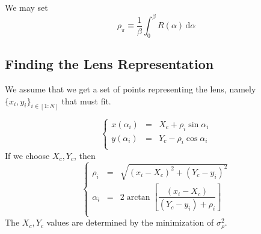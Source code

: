 \documentclass[aps,onecolumn]{revtex4}
\begin{document}
We may set 
\begin{equation}
	\rho_\pi \equiv \dfrac{1}{\beta}\int_0^\beta R(\alpha)\,\mathrm{d}\alpha
\end{equation}

\subsection{Finding the Lens Representation}
We assume that we get a set of points representing the lens, namely $\lbrace x_i,y_i \rbrace_{i\in[1:N]}$ that must
fit.

\begin{equation}
	\left\lbrace
		\begin{array}{rcl}
	x(\alpha_i) & = & X_c + \rho_i\sin\alpha_i\\
	y(\alpha_i) & = & Y_c - \rho_i\cos\alpha_i\\
		\end{array}
	\right.
\end{equation}
If we choose $X_c,Y_c$, then
\begin{equation}
	\left\lbrace
	\begin{array}{rcl}	
	\rho_i   &=&\sqrt{\left(x_i-X_c\right)^2+\left(Y_c-y_i\right)^2}\\
	\alpha_i &=& 2 \arctan\left[ \dfrac{\left(x_i-X_c\right)}{\left(Y_c-y_i\right)+\rho_i}\right]\\
	\end{array}
	\right.
\end{equation}
The $X_c,Y_c$ values are determined by the minimization of $\sigma^2_\rho$.
\end{document}
